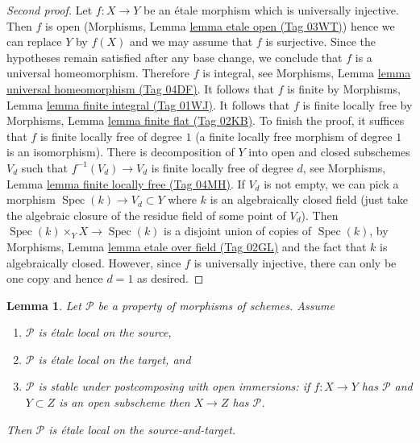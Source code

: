 \documentclass{amsart}
\theoremstyle{plain}
\newtheorem{lemma}[subsection]{Lemma}
\theoremstyle{definition}
\theoremstyle{remark}
\numberwithin{equation}{subsection}
\def\Spec{\mathop{\mathrm{Spec}}}
\begin{document}
\begin{proof}[Second proof]
Let $f : X \to Y$ be an \'etale morphism which is universally injective.
Then $f$ is open (Morphisms, Lemma \href{https://stacks.math.columbia.edu/tag/03WT}{lemma etale open (Tag 03WT)})
hence we can replace $Y$ by $f(X)$ and we may assume that $f$ is surjective.
Since the hypotheses remain satisfied after any base change, we conclude
that $f$ is a universal homeomorphism. Therefore $f$ is integral, see
Morphisms, Lemma \href{https://stacks.math.columbia.edu/tag/04DF}{lemma universal homeomorphism (Tag 04DF)}.
It follows that $f$ is finite by
Morphisms, Lemma \href{https://stacks.math.columbia.edu/tag/01WJ}{lemma finite integral (Tag 01WJ)}.
It follows that $f$ is finite locally free by
Morphisms, Lemma \href{https://stacks.math.columbia.edu/tag/02KB}{lemma finite flat (Tag 02KB)}.
To finish the proof, it suffices that $f$ is finite locally
free of degree $1$ (a finite locally free morphism of degree $1$
is an isomorphism).
There is decomposition of $Y$ into open and closed subschemes
$V_d$ such that $f^{-1}(V_d) \to V_d$ is finite locally free of
degree $d$, see Morphisms, Lemma \href{https://stacks.math.columbia.edu/tag/04MH}{lemma finite locally free (Tag 04MH)}.
If $V_d$ is not empty, we can pick a morphism $\Spec(k) \to V_d \subset Y$
where $k$ is an algebraically closed field (just take the algebraic
closure of the residue field of some point of $V_d$).
Then $\Spec(k) \times_Y X \to \Spec(k)$ is a disjoint union of
copies of $\Spec(k)$, by
Morphisms, Lemma \href{https://stacks.math.columbia.edu/tag/02GL}{lemma etale over field (Tag 02GL)}
and the fact that $k$ is algebraically closed.
However, since $f$ is universally injective, there can only be
one copy and hence $d = 1$ as desired.
\end{proof}


\begin{lemma}
\label{lemma-etale-local-source-target}
Let $\mathcal{P}$ be a property of morphisms of schemes.
Assume
\begin{enumerate}
\item $\mathcal{P}$ is \'etale local on the source,
\item $\mathcal{P}$ is \'etale local on the target, and
\item $\mathcal{P}$ is stable under postcomposing with open immersions:
if $f : X \to Y$ has $\mathcal{P}$ and $Y \subset Z$ is an open
subscheme then $X \to Z$ has $\mathcal{P}$.
\end{enumerate}
Then $\mathcal{P}$ is \'etale local on the source-and-target.
\end{lemma}
\end{document}
